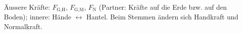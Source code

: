 Äussere Kräfte: $F_\text{G,H}$, $F_\text{G,M}$, $F_\text{N}$ (Partner: Kräfte auf die Erde bzw. auf den Boden); innere: Hände $\leftrightarrow$ Hantel. Beim Stemmen ändern sich Handkraft und Normalkraft.
